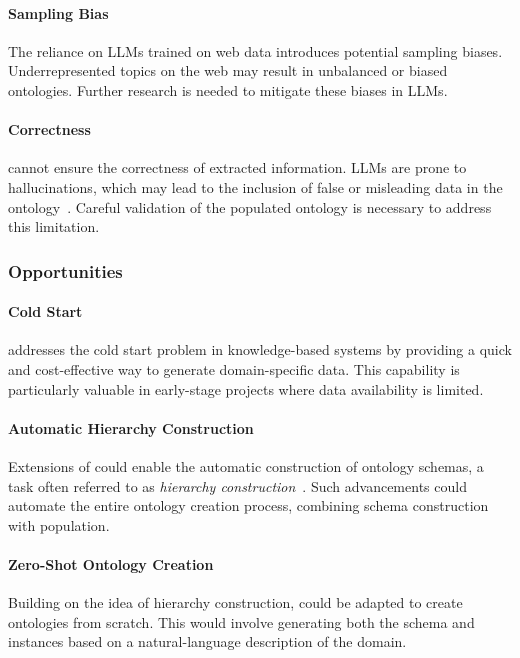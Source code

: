 \paragraph{Sampling Bias}
%
The reliance on \glspl{LLM} trained on web data introduces potential sampling biases.
%
Underrepresented topics on the web may result in unbalanced or biased ontologies.
%
Further research is needed to mitigate these biases in \glspl{LLM}.

\paragraph{Correctness}
%
\llmfkg{} cannot ensure the correctness of extracted information.
%
\glspl{LLM} are prone to hallucinations, which may lead to the inclusion of false or misleading data in the ontology~\cite{hallucination-2023}.
%
Careful validation of the populated ontology is necessary to address this limitation.


\subsubsection{Opportunities}
\label{subsubsec:opportunities}
%
\paragraph{Cold Start}
%
\llmfkg{} addresses the cold start problem in knowledge-based systems by providing a quick and cost-effective way to generate domain-specific data.
%
This capability is particularly valuable in early-stage projects where data availability is limited.

\paragraph{Automatic Hierarchy Construction}
%
Extensions of \llmfkg{} could enable the automatic construction of ontology schemas, a task often referred to as \emph{hierarchy construction}~\cite{funk2023ontology}.
%
Such advancements could automate the entire ontology creation process, combining schema construction with population.


\paragraph{Zero-Shot Ontology Creation}
%
Building on the idea of hierarchy construction, \llmfkg{} could be adapted to create ontologies from scratch.
%
This would involve generating both the schema and instances based on a natural-language description of the domain.

